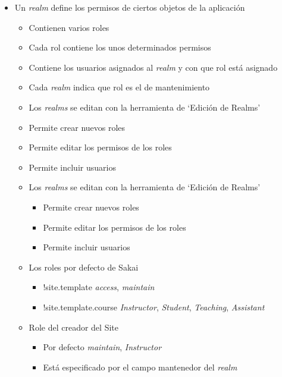 \begin{itemize}
\begin{itemize}
 \item Un \textit{realm} define los permisos de ciertos objetos de la aplicación

\begin{itemize}
\item Contienen varios roles
\item Cada rol contiene los unos determinados permisos
\item Contiene los usuarios asignados al \textit{realm} y con que rol está
asignado
\item Cada \textit{realm} indica que rol es el de mantenimiento
\item Los \textit{realms} se editan con la herramienta de ‘Edición de Realms’
\item Permite crear nuevos roles
\item Permite editar los permisos de los roles
\item Permite incluir usuarios
\end{itemize}

\begin{itemize}
 \item Los \textit{realms} se editan con la herramienta de ‘Edición de Realms’

\begin{itemize}
\item Permite crear nuevos roles
\item Permite editar los permisos de los roles
\item Permite incluir usuarios
\end{itemize}


\item Los roles por defecto de Sakai

\begin{itemize}
\item $!$site.template \rightsquigarrow  \textit{access}, \textit{maintain}

\item $!$site.template.course \rightsquigarrow \textit{Instructor},
\textit{Student}, \textit{Teaching}, \textit{Assistant}
\end{itemize}

\item Role del creador del Site

\begin{itemize}
 \item Por defecto \textit{maintain}, \textit{Instructor}
\item Está especificado por el campo mantenedor del \textit{realm}
\end{itemize}


\end{itemize}
\end{itemize}
\end{itemize}



